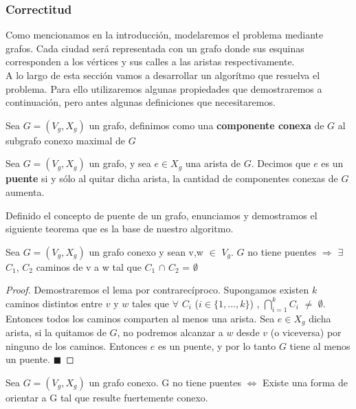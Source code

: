 \subsubsection{Correctitud}

Como mencionamos en la introducción, modelaremos el problema mediante grafos. Cada ciudad será representada con un grafo donde sus esquinas corresponden a los vértices y sus calles a las aristas respectivamente. \\
A lo largo de esta sección vamos a desarrollar un algorítmo que resuelva el problema. Para ello utilizaremos algunas propiedades que demostraremos a continuación, pero antes algunas definiciones que necesitaremos.

\begin{definition}
Sea $G=(V_g,X_g)$ un grafo, definimos como una \textbf{componente conexa} de $G$ al subgrafo conexo maximal de $G$
\end{definition}

\begin{definition}
Sea $G=(V_g,X_g)$ un grafo, y sea $e \in X_g$ una arista de $G$. Decimos que $e$ es un \textbf{puente} si y sólo al quitar dicha arista, la cantidad de componentes conexas de $G$ aumenta.
\end{definition}

Definido el concepto de puente de un grafo, enunciamos y demostramos el siguiente teorema que es la base de nuestro algoritmo.

\begin{lemma}
Sea $G=(V_g,X_g)$ un grafo conexo y sean v,w $\in$ $V_g$. $G$ no tiene puentes $\Rightarrow$ $\exists$ $C_1$, $C_2$ caminos de v a w tal que $C_1$ $\cap$ $C_2$ = $\emptyset$
\end{lemma}

\begin{proof}
Demostraremos el lema por contrarecíproco. Supongamos existen $k$ caminos distintos entre $v$ y $w$ tales que $\forall$ $C_i$ ($i \in \{1,\ldots,k\}$) , $\displaystyle\bigcap_{i = 1}^{k} C_i$ $\neq$ $\emptyset$. 
Entonces todos los caminos comparten al menos una arista. Sea $e \in X_g$ dicha arista, si la quitamos de $G$, no podremos alcanzar a $w$ desde $v$ (o viceversa) por ninguno de los caminos. 
Entonces $e$ es un puente, y por lo tanto $G$ tiene al menos un puente.  $\blacksquare$
\end{proof}

\begin{theorem}
Sea $G=(V_g,X_g)$ un grafo conexo. G no tiene puentes $\Longleftrightarrow$ Existe una forma de orientar a G tal que resulte fuertemente conexo.
\end{theorem}

